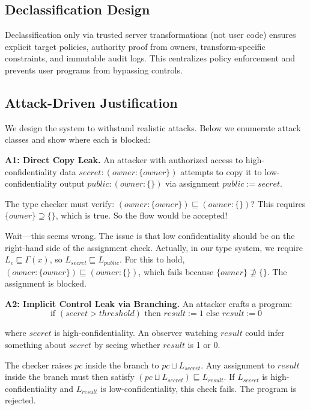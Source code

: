 \subsection{Declassification Design}

Declassification only via trusted server transformations (not user code) ensures explicit target policies, authority proof from owners, transform-specific constraints, and immutable audit logs. This centralizes policy enforcement and prevents user programs from bypassing controls.

\subsection{Attack-Driven Justification}

We design the system to withstand realistic attacks. Below we enumerate attack classes and show where each is blocked:

\textbf{A1: Direct Copy Leak.} An attacker with authorized access to high-confidentiality data $secret: (owner:\{owner\})$ attempts to copy it to low-confidentiality output $public: (owner:\{\})$ via assignment $public := secret$.

The type checker must verify: $(owner:\{owner\}) \sqsubseteq (owner:\{\})$? This requires $\{owner\} \supseteq \{\}$, which is true. So the flow would be accepted!

Wait—this seems wrong. The issue is that low confidentiality should be on the right-hand side of the assignment check. Actually, in our type system, we require $L_e \sqsubseteq \Gamma(x)$, so $L_{secret} \sqsubseteq L_{public}$. For this to hold, $(owner:\{owner\}) \sqsubseteq (owner:\{\})$, which fails because $\{owner\} \not\supseteq \{\}$. The assignment is blocked. \checkmark

\textbf{A2: Implicit Control Leak via Branching.} An attacker crafts a program:
\[\text{if } (secret > threshold) \text{ then } result := 1 \text{ else } result := 0\]

where $secret$ is high-confidentiality. An observer watching $result$ could infer something about $secret$ by seeing whether $result$ is 1 or 0.

The checker raises $pc$ inside the branch to $pc \sqcup L_{secret}$. Any assignment to $result$ inside the branch must then satisfy $(pc \sqcup L_{secret}) \sqsubseteq L_{result}$. If $L_{secret}$ is high-confidentiality and $L_{result}$ is low-confidentiality, this check fails. The program is rejected. \checkmark

